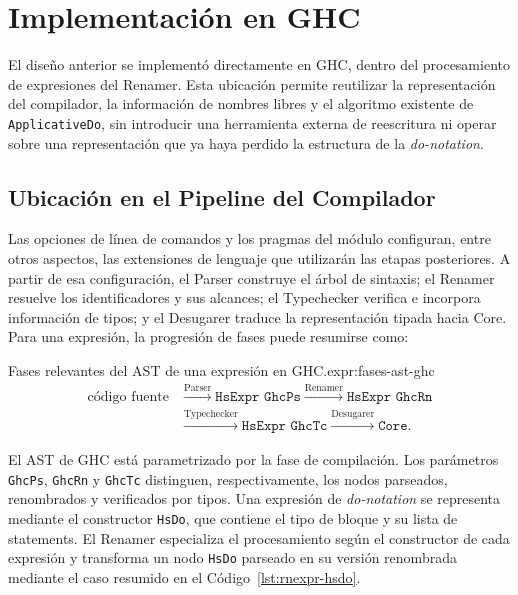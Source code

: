 
\section{Implementación en GHC}
\label{sec:solucion-implementacion}

El diseño anterior se implementó directamente en \textsf{GHC}, dentro del procesamiento de expresiones del Renamer. Esta ubicación permite reutilizar la representación del compilador, la información de nombres libres y el algoritmo existente de \texttt{ApplicativeDo}, sin introducir una herramienta externa de reescritura ni operar sobre una representación que ya haya perdido la estructura de la \textit{do-notation}.

\subsection{Ubicación en el Pipeline del Compilador}
\label{sec:solucion-pipeline-ghc}

Las opciones de línea de comandos y los pragmas del módulo configuran, entre otros aspectos, las extensiones de lenguaje que utilizarán las etapas posteriores. A partir de esa configuración, el Parser construye el árbol de sintaxis; el Renamer resuelve los identificadores y sus alcances; el Typechecker verifica e incorpora información de tipos; y el Desugarer traduce la representación tipada hacia Core. Para una expresión, la progresión de fases puede resumirse como:

\begin{ReportExpression}{Fases relevantes del AST de una expresión en GHC.}{expr:fases-ast-ghc}
\[
\begin{aligned}
\text{código fuente}
&\xrightarrow{\mathrm{Parser}}
\texttt{HsExpr GhcPs}
\xrightarrow{\mathrm{Renamer}}
\texttt{HsExpr GhcRn}\\
&\xrightarrow{\mathrm{Typechecker}}
\texttt{HsExpr GhcTc}
\xrightarrow{\mathrm{Desugarer}}
\texttt{Core}.
\end{aligned}
\]
\end{ReportExpression}

El AST de \textsf{GHC} está parametrizado por la fase de compilación. Los parámetros \texttt{GhcPs}, \texttt{GhcRn} y \texttt{GhcTc} distinguen, respectivamente, los nodos parseados, renombrados y verificados por tipos. Una expresión de \textit{do-notation} se representa mediante el constructor \texttt{HsDo}, que contiene el tipo de bloque y su lista de statements. El Renamer especializa el procesamiento según el constructor de cada expresión y transforma un nodo \texttt{HsDo} parseado en su versión renombrada mediante el caso resumido en el Código~\ref{lst:rnexpr-hsdo}.

